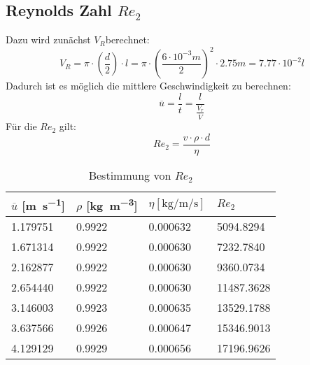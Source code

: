 \documentclass{article}
\begin{document}
\subsection{Reynolds Zahl $Re _2$}
Dazu wird zunächst $V _R$berechnet:
\begin{equation}
  V _R = \pi \cdot (\frac{d}{2}) \cdot l = \pi \cdot (\frac{6 \cdot 10^{-3} m}{2})^2 \cdot 2.75 m = 7.77 \cdot 10 ^{-2} l
\end{equation}
Dadurch ist es möglich die mittlere Geschwindigkeit zu berechnen:
\begin{equation}
  \overline{u} = \frac{l}{t} = \frac{l}{\frac{V_r}{\dot V}}
\end{equation}
Für die $Re_2$ gilt:
\begin{equation}
  Re _2 = \frac{v \cdot \rho \cdot d}{\eta}
\end{equation}
 \begin{table}[ht!]
  \centering
 \begin{tabularx}{\textwidth}{XXXX}
 $\overline u$ [\si{\meter\per\second}]  &  $\rho$ [\si{\kilo\gram\per\cubic\meter}] &
 $ \eta [\si{\kilo\gram\per\meter\per\second}] $ & $Re _2 $  \\
\hline
\rowcolor{LightCyan}
1.179751 & 0.9922 & 0.000632 &5094.8294 \\
1.671314 & 0.9922 & 0.000630 &7232.7840 \\
\rowcolor{LightCyan}
2.162877 & 0.9922 & 0.000630 &9360.0734 \\
2.654440 & 0.9922 & 0.000630 &11487.3628\\
\rowcolor{LightCyan}
3.146003 & 0.9923 & 0.000635 &13529.1788\\
3.637566 & 0.9926 & 0.000647 &15346.9013\\
\rowcolor{LightCyan}
4.129129 & 0.9929 & 0.000656 &17196.9626\\
\end{tabularx}
  \caption{Bestimmung von $Re _2$}
\end{table}
\end{document}
